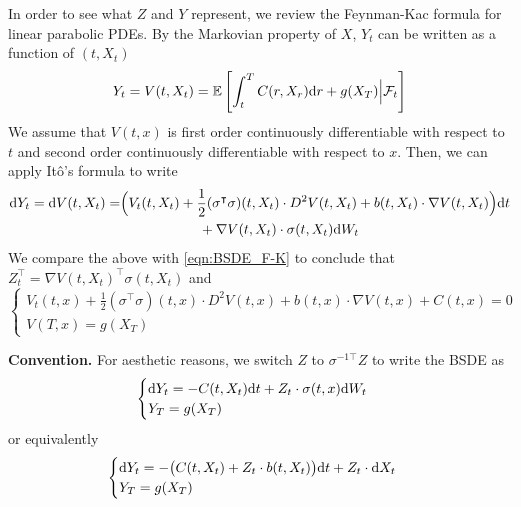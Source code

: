 \documentclass[11pt]{book}
\newcommand{\dd}{\text{\normalfont d}}
\newcommand{\dt}{\text{\normalfont d}t}
\newcommand{\dr}{\text{\normalfont d}r}
\newcommand{\dX}{\text{\normalfont d}X}
\newcommand{\dW}{\text{\normalfont d}W}
\begin{document}
In order to see what $Z$ and $Y$ represent, we review the Feynman-Kac formula for  linear parabolic PDEs. 
    By the Markovian property of $X$, $Y_t$ can be written as a function of $(t,X_t)$
\begin{equation}
\label{eqn:F-K}
    Y_t=V(t,X_t)=\mathbb{E}\left[\int_t^T C(r,X_r){{\dr}}+g(X_T)\Big|\mathcal{F}_t\right]
\end{equation}
We assume that $V(t,x)$ is first order continuously  differentiable with respect to $t$ and second order continuously  differentiable with respect to $x$. Then, we can apply Itô's formula to write
\[
\begin{split}
    \dd Y_t = \dd V(t,X_t)  = &\Big(V_t(t,X_t)+\frac12(\sigma^{\intercal}\sigma)(t,X_t)\cdot D^2 V(t,X_t) + b(t,X_t)\cdot \nabla V(t,X_t)\Big)\dt \\
    &\hspace{2cm} +  \nabla V(t,X_t)\cdot \sigma(t,X_t)\dW_t
\end{split}
\]
We compare the above with \eqref{eqn:BSDE_F-K} to conclude that $Z_t^\top = \nabla V(t,X_t)^\top \sigma(t,X_t)$ and
\begin{equation}
\label{eqn:PDE_linear}
    \begin{cases}
    V_t(t,x)+\frac12(\sigma^{\intercal}\sigma)(t,x)\cdot D^2 V(t,x) + b(t,x)\cdot \nabla V(t,x) + C(t,x) = 0\\
    V(T,x) = g(X_T)
\end{cases}
\end{equation}

\textbf{Convention.} For aesthetic reasons, we switch $Z$ to $\sigma^{-1\top}Z$ to write the BSDE as
\begin{equation}
\label{eqn:BSDE_F-K_newZ}
    \begin{cases}
    \dd Y_t =  - C(t,X_t){\dt} + Z_t\cdot \sigma(t,x) \dW_t\\
    Y_T=g(X_T)
\end{cases}
\end{equation}
or equivalently
\begin{equation}
\label{eqn:BSDE_F-K_dX}
    \begin{cases}
    \dd Y_t =  - \big(C(t,X_t)+Z_t\cdot b(t,X_t)\big){\dt} + Z_t\cdot \dX_t\\
    Y_T=g(X_T)
\end{cases}
\end{equation}
\end{document}
